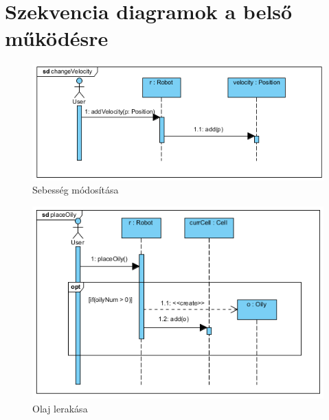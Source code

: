 \section{Szekvencia diagramok a belső működésre}


\begin{figure}[!htbp]
	\begin{center}
		\includegraphics[width=13cm]{./chapters/chapter05/changevelocity.png}
		\caption{Sebesség módosítása}
	\end{center}
\end{figure}

\begin{figure}[!htbp]
	\begin{center}
		\includegraphics[width=13cm]{./chapters/chapter05/placeoilysequence.png}
		\caption{Olaj lerakása}
	\end{center}
\end{figure}

